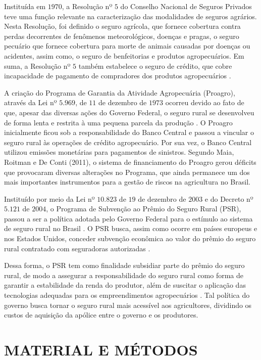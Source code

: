 Instituída em $1970$, a Resolução nº $5$ do Conselho Nacional de Seguros Privados teve uma função relevante na caracterização das modalidades de seguros agrários. Nesta Resolução, foi definido o seguro agrícola, que fornece cobertura contra perdas decorrentes de fenômenos meteorológicos, doenças e pragas, o seguro pecuário que fornece cobertura para morte de animais causadas por doenças ou acidentes, assim como, o seguro de benfeitorias e produtos agropecuários. Em suma, a Resolução nº $5$ também estabelece o seguro de crédito, que cobre incapacidade de pagamento de compradores dos produtos agropecuários \cite{silva14}.

A criação do Programa de Garantia da Atividade Agropecuária (Proagro), através da Lei nº $5.969$, de $11$ de dezembro de $1973$ ocorreu devido ao fato de que, apesar das diversas ações do Governo Federal, o seguro rural se desenvolveu de forma lenta e restrita à uma pequena parcela da produção \cite{silva14}. O Proagro inicialmente ficou sob a responsabilidade do Banco Central e passou a vincular o seguro rural às operações de crédito agropecuário. Por sua vez, o Banco Central utilizou emissões monetárias para pagamentos de sinistros. Segundo Maia, Roitman e De Conti (2011), o sistema de financiamento do Proagro gerou déficits que provocaram diversas alterações no Programa, que ainda permanece um dos mais importantes instrumentos para a gestão de riscos na agricultura no Brasil.

Instituído por meio da Lei nº $10.823$ de $19$ de dezembro de $2003$ e do Decreto nº $5.121$ de $2004$, o Programa de Subvenção ao Prêmio do Seguro Rural (PSR), passou a ser a política adotada pelo Governo Federal para o estímulo ao sistema de seguro rural no Brasil \cite{brasil18}. O PSR busca, assim como ocorre em países europeus e nos Estados Unidos, conceder subvenção econômica ao valor do prêmio do seguro rural contratado com seguradoras autorizadas \cite{maia11, silva14}.

Dessa forma, o PSR tem como finalidade subsidiar parte do prêmio do seguro rural, de modo a assegurar a responsabilidade do seguro rural como forma de garantir a estabilidade da renda do produtor, além de suscitar o aplicação das tecnologias adequadas para os empreendimentos agropecuários \cite{guia_20}. Tal política do governo busca tornar o seguro rural mais acessível aos agricultores, dividindo os custos de aquisição da apólice entre o governo e os produtores. 


\section{MATERIAL E MÉTODOS}\label{material_e_metodos}

